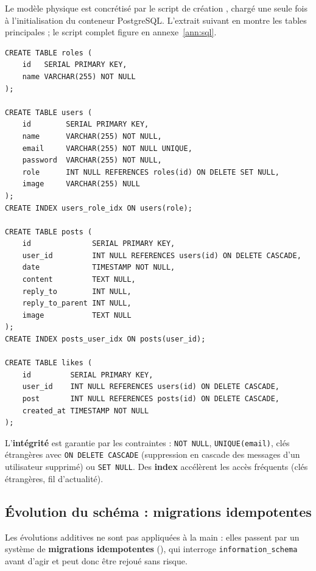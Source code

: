 Le modèle physique est concrétisé par le script de création , chargé une
seule fois à l'initialisation du conteneur PostgreSQL. L'extrait suivant en montre les tables
principales ; le script complet figure en annexe~\ref{ann:sql}.

\begin{lstlisting}[style=sql, caption={Extrait du script de création — \file{solage.pg.sql}}]
CREATE TABLE roles (
    id   SERIAL PRIMARY KEY,
    name VARCHAR(255) NOT NULL
);

CREATE TABLE users (
    id        SERIAL PRIMARY KEY,
    name      VARCHAR(255) NOT NULL,
    email     VARCHAR(255) NOT NULL UNIQUE,
    password  VARCHAR(255) NOT NULL,
    role      INT NULL REFERENCES roles(id) ON DELETE SET NULL,
    image     VARCHAR(255) NULL
);
CREATE INDEX users_role_idx ON users(role);

CREATE TABLE posts (
    id              SERIAL PRIMARY KEY,
    user_id         INT NULL REFERENCES users(id) ON DELETE CASCADE,
    date            TIMESTAMP NOT NULL,
    content         TEXT NULL,
    reply_to        INT NULL,
    reply_to_parent INT NULL,
    image           TEXT NULL
);
CREATE INDEX posts_user_idx ON posts(user_id);

CREATE TABLE likes (
    id         SERIAL PRIMARY KEY,
    user_id    INT NULL REFERENCES users(id) ON DELETE CASCADE,
    post       INT NULL REFERENCES posts(id) ON DELETE CASCADE,
    created_at TIMESTAMP NOT NULL
);
\end{lstlisting}

L'\textbf{intégrité} est garantie par les contraintes : \texttt{NOT NULL},
\texttt{UNIQUE(email)}, clés étrangères avec \texttt{ON DELETE CASCADE} (suppression en cascade
des messages d'un utilisateur supprimé) ou \texttt{SET NULL}. Des \textbf{index} accélèrent les
accès fréquents (clés étrangères, fil d'actualité).

\subsection{Évolution du schéma : migrations idempotentes}

Les évolutions additives ne sont pas appliquées à la main : elles passent par un système de
\textbf{migrations idempotentes} (), qui interroge
\texttt{information\_schema} avant d'agir et peut donc être rejoué sans risque.

